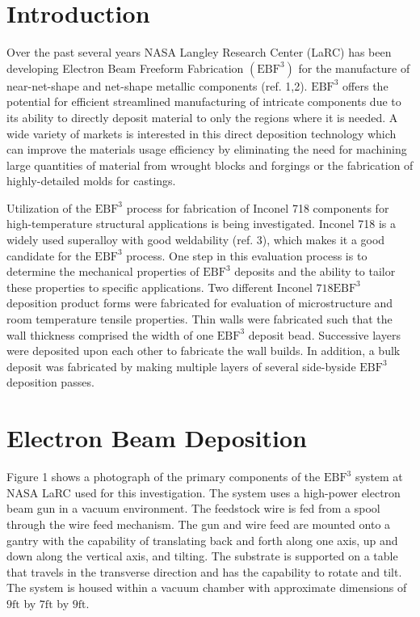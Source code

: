 \documentclass[10pt]{article}
\begin{document}
\section*{Introduction }
Over the past several years NASA Langley Research Center (LaRC) has been developing Electron Beam Freeform Fabrication $\left(\mathrm{EBF}^{3}\right)$ for the manufacture of near-net-shape and net-shape metallic components (ref. 1,2). $\mathrm{EBF}^{3}$ offers the potential for efficient streamlined manufacturing of intricate components due to its ability to directly deposit material to only the regions where it is needed. A wide variety of markets is interested in this direct deposition technology which can improve the materials usage efficiency by eliminating the need for machining large quantities of material from wrought blocks and forgings or the fabrication of highly-detailed molds for castings.

Utilization of the $\mathrm{EBF}^{3}$ process for fabrication of Inconel 718 components for high-temperature structural applications is being investigated. Inconel 718 is a widely used superalloy with good weldability (ref. 3), which makes it a good candidate for the $\mathrm{EBF}^{3}$ process. One step in this evaluation process is to determine the mechanical properties of $\mathrm{EBF}^{3}$ deposits and the ability to tailor these properties to specific applications. Two different Inconel $718 \mathrm{EBF}^{3}$ deposition product forms were fabricated for evaluation of microstructure and room temperature tensile properties. Thin walls were fabricated such that the wall thickness comprised the width of one $\mathrm{EBF}^{3}$ deposit bead. Successive layers were deposited upon each other to fabricate the wall builds. In addition, a bulk deposit was fabricated by making multiple layers of several side-byside $\mathrm{EBF}^{3}$ deposition passes.

\section*{Electron Beam Deposition}
Figure 1 shows a photograph of the primary components of the $\mathrm{EBF}^{3}$ system at NASA LaRC used for this investigation. The system uses a high-power electron beam gun in a vacuum environment. The feedstock wire is fed from a spool through the wire feed mechanism. The gun and wire feed are mounted onto a gantry with the capability of translating back and forth along one axis, up and down along the vertical axis, and tilting. The substrate is supported on a table that travels in the transverse direction and has the capability to rotate and tilt. The system is housed within a vacuum chamber with approximate dimensions of $9 \mathrm{ft}$ by $7 \mathrm{ft}$ by $9 \mathrm{ft}$.
\end{document}
